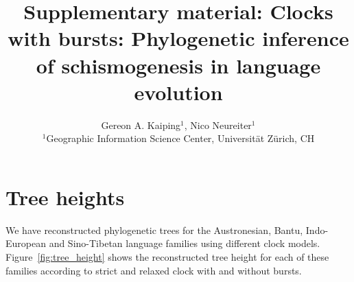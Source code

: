 \documentclass[a4paper]{article}
\title{Supplementary material: Clocks with bursts: Phylogenetic inference of schismogenesis in language evolution}
\date{}
\author{
  Gereon A. Kaiping$^{1}$,
  Nico Neureiter$^{1}$\\[2ex]
  $^{1}$Geographic Information Science Center, Universität Zürich, CH
}
\begin{document}
\maketitle
\renewcommand{\thepage}{S\arabic{page}} 
\renewcommand{\thesection}{S\arabic{section}}  
\renewcommand{\thetable}{S\arabic{table}}  
\renewcommand{\thefigure}{S\arabic{figure}}
\renewcommand{\figurename}{Figure} 

\section{Tree heights}
We have reconstructed phylogenetic trees for the Austronesian, Bantu, Indo-European and Sino-Tibetan language families using different clock models. Figure~\ref{fig:tree_height} shows the reconstructed tree height for each of these families according to strict and relaxed clock with and without bursts.
\end{document}
